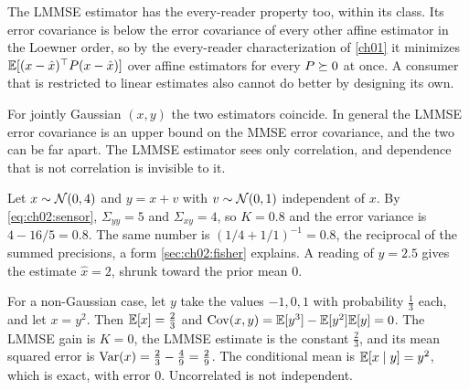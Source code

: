 The LMMSE estimator has the every-reader property too, within its class. Its
error covariance is below the error covariance of every other affine
estimator in the Loewner order, so by the every-reader characterization of
\cref{ch01} it minimizes $\mathbb{E}[(x-\hat x)^{\top} P(x-\hat x)]$ over affine estimators
for every $P\succeq0$ at once. A consumer that is restricted to linear estimates
also cannot do better by designing its own.

For jointly Gaussian $(x,y)$ the two estimators coincide. In general the LMMSE
error covariance is an upper bound on the MMSE error covariance, and the two
can be far apart. The LMMSE estimator sees only correlation, and dependence
that is not correlation is invisible to it.

\begin{example}\label{ex:ch02:mmse}
Let $x\sim\mathcal{N}(0,4)$ and $y=x+v$ with $v\sim\mathcal{N}(0,1)$ independent of
$x$. By \cref{eq:ch02:sensor}, $\Sigma_{yy}=5$ and $\Sigma_{xy}=4$, so
$K=0.8$ and the error variance is $4-16/5=0.8$. The same number is
$(1/4+1/1)^{-1}=0.8$, the reciprocal of the summed precisions, a form
\cref{sec:ch02:fisher} explains. A reading of $y=2.5$ gives the estimate
$\hat x=2$, shrunk toward the prior mean $0$.

For a non-Gaussian case, let $y$ take the values $-1,0,1$ with probability
$\tfrac13$ each, and let $x=y^2$. Then $\mathbb{E}[x]=\tfrac23$ and
$\operatorname{Cov}(x,y)=\mathbb{E}[y^3]-\mathbb{E}[y^2]\mathbb{E}[y]=0$. The LMMSE gain is $K=0$, the LMMSE estimate
is the constant $\tfrac23$, and its mean squared error is
$\operatorname{Var}(x)=\tfrac23-\tfrac49=\tfrac29$. The conditional mean is $\mathbb{E}[x\mid y]=y^2$,
which is exact, with error $0$. Uncorrelated is not independent.
\end{example}



